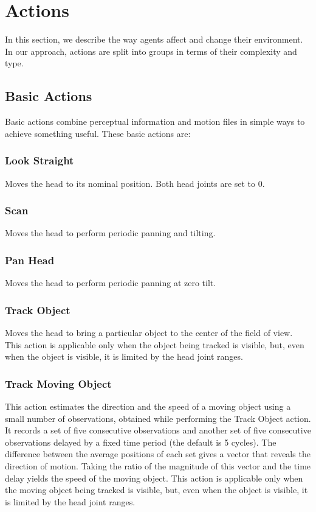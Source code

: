 \section{Actions}
In this section, we describe the way agents affect and change their environment. In our approach, actions are split into groups in terms of their complexity and type.

\subsection{Basic Actions}
Basic actions combine perceptual information and motion files in simple ways to achieve something useful. These basic actions are:
 
\subsubsection*{Look Straight}
 Moves the head to its nominal position. Both head joints are set to $0$.

\subsubsection*{Scan} 
Moves the head to perform periodic panning and tilting. 
 
\subsubsection*{Pan Head} 
Moves the head to perform periodic panning at zero tilt.
 
\subsubsection*{Track Object} 
Moves the head to bring a particular object to the center of the field of view. This action is applicable only when the object being tracked is visible, but, even when the object is visible, it is limited by the head joint ranges. 
 
\subsubsection*{Track Moving Object} 
This action estimates the direction and the speed of a moving object using a small number of observations, obtained while performing the Track Object action. It records a set of five consecutive observations and another set of five consecutive observations delayed by a fixed time period (the default is 5 cycles).  The difference between the average positions of each set gives a vector that reveals the direction of motion. Taking the ratio of the magnitude of this vector and the time delay yields the speed of the moving object. This action is applicable only when the moving object being tracked is visible, but, even when the object is visible, it is limited by the head joint ranges.
 
